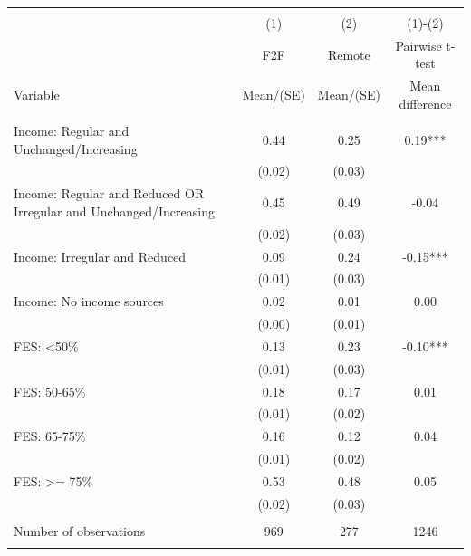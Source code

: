 
\begin{tabular}{@{\extracolsep{5pt}}lccc}
\\[-1.8ex]\hline \hline \\[-1.8ex]
 & \multicolumn{1}{c}{(1)}  & \multicolumn{1}{c}{(2)}  & \multicolumn{1}{c}{(1)-(2)} \\
 & \multicolumn{1}{c}{F2F}  & \multicolumn{1}{c}{Remote}  & \multicolumn{1}{c}{Pairwise t-test}  \\
Variable & Mean/(SE) & Mean/(SE) & Mean difference \\ \hline \\[-1.8ex] 
Income: Regular and Unchanged/Increasing   & 0.44    & 0.25    & 0.19***   \\
 & (0.02)  & (0.03)  &  \\ [1ex]
Income: Regular and Reduced OR Irregular and Unchanged/Increasing   & 0.45    & 0.49    & -0.04   \\
 & (0.02)  & (0.03)  &  \\ [1ex]
Income: Irregular and Reduced   & 0.09    & 0.24    & -0.15***   \\
 & (0.01)  & (0.03)  &  \\ [1ex]
Income: No income sources   & 0.02    & 0.01    & 0.00   \\
 & (0.00)  & (0.01)  &  \\ [1ex]
FES: <50\%   & 0.13    & 0.23    & -0.10***   \\
 & (0.01)  & (0.03)  &  \\ [1ex]
FES: 50-65\%   & 0.18    & 0.17    & 0.01   \\
 & (0.01)  & (0.02)  &  \\ [1ex]
FES: 65-75\%   & 0.16    & 0.12    & 0.04   \\
 & (0.01)  & (0.02)  &  \\ [1ex]
FES: >= 75\%   & 0.53    & 0.48    & 0.05   \\
 & (0.02)  & (0.03)  &  \\ [1ex]
\hline \\[-1.8ex]
Number of observations  & 969   & 277  & 1246  \\
\hline \hline \\[-1.8ex]

\end{tabular}
